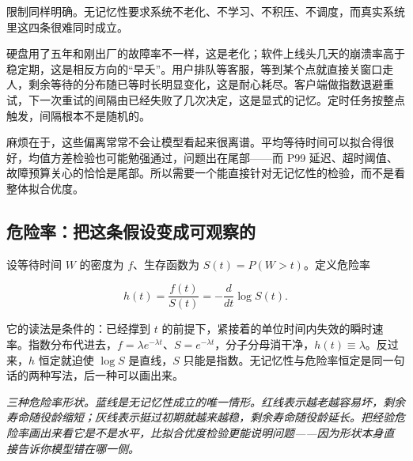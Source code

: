 限制同样明确。无记忆性要求系统不老化、不学习、不积压、不调度，而真实系统里这四条很难同时成立。

硬盘用了五年和刚出厂的故障率不一样，这是老化；软件上线头几天的崩溃率高于稳定期，这是相反方向的``早夭''。用户排队等客服，等到某个点就直接关窗口走人，剩余等待的分布随已等时长明显变化，这是耐心耗尽。客户端做指数退避重试，下一次重试的间隔由已经失败了几次决定，这是显式的记忆。定时任务按整点触发，间隔根本不是随机的。

麻烦在于，这些偏离常常不会让模型看起来很离谱。平均等待时间可以拟合得很好，均值方差检验也可能勉强通过，问题出在尾部——而 P99 延迟、超时阈值、故障预算关心的恰恰是尾部。所以需要一个能直接针对无记忆性的检验，而不是看整体拟合优度。

\subsection{危险率：把这条假设变成可观察的}

设等待时间 \(W\) 的密度为 \(f\)、生存函数为 \(S(t)=P(W>t)\)。定义危险率

\[
h(t)=\frac{f(t)}{S(t)}=-\frac{d}{dt}\log S(t).
\]

它的读法是条件的：已经撑到 \(t\) 的前提下，紧接着的单位时间内失效的瞬时速率。指数分布代进去，\(f=\lambda e^{-\lambda t}\)、\(S=e^{-\lambda t}\)，分子分母消干净，\(h(t)\equiv\lambda\)。反过来，\(h\) 恒定就迫使 \(\log S\) 是直线，\(S\) 只能是指数。无记忆性与危险率恒定是同一句话的两种写法，后一种可以画出来。

\begin{center}

\emph{三种危险率形状。蓝线是无记忆性成立的唯一情形。红线表示越老越容易坏，剩余寿命随役龄缩短；灰线表示挺过初期就越来越稳，剩余寿命随役龄延长。把经验危险率画出来看它是不是水平，比拟合优度检验更能说明问题——因为形状本身直接告诉你模型错在哪一侧。}
\end{center}

